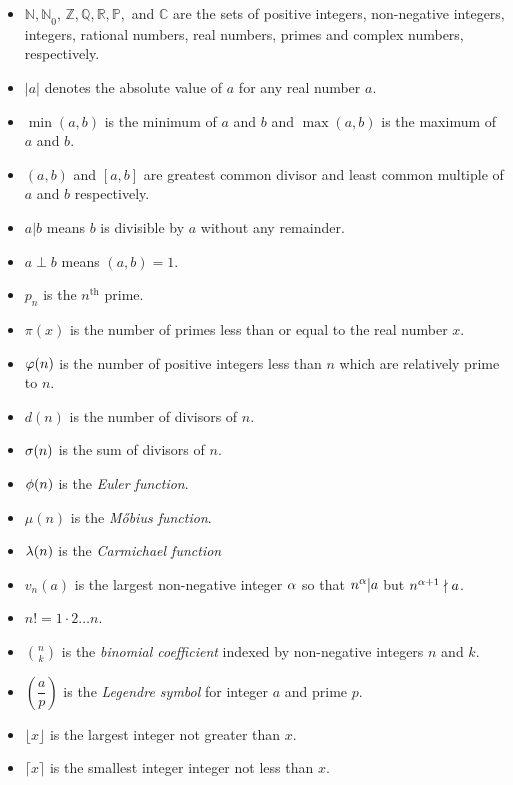 \documentclass{subfile}
\begin{document}
		\begin{itemize}
			\item $\mathbb{N,N}_0$, $\mathbb{Z, Q, R, P},$ and $\mathbb{C}$ are the sets of positive integers, non-negative integers, integers, rational numbers, real numbers, primes and complex numbers, respectively.
			\item $|a|$ denotes the absolute value of $a$ for any real number $a$.
			\item $\min(a,b)$ is the minimum of $a$ and $b$ and $\max(a,b)$ is the maximum of $a$ and $b$.
			\item $(a,b)$ and $[a,b]$ are greatest common divisor and least common multiple of $a$ and $b$ respectively.
			\item $a|b$ means $b$ is divisible by $a$ without any remainder.
			\item $a\perp b$ means $(a,b)=1$.
			\item $p_n$ is the $n^{\text{th}}$ prime.
			\item $\pi(x)$ is the number of primes less than or equal to the real number $x$.		
			\item $\varphi(n)$ is the number of positive integers less than $n$ which are relatively prime to $n$.
			\item $d(n)$ is the number of divisors of $n$.
			\item $\sigma(n)$ is the sum of divisors of $n$.
			\item $\phi(n)$ is the {\it Euler function}.
			\item $\mu(n)$ is the {\it M\H{o}bius function}.
			\item $\lambda(n)$ is the {\it Carmichael function}
			\item $v_n(a)$ is the largest non-negative integer $\alpha$ so that $n^\alpha|a$ but $n^{\alpha+1}\nmid a$.
			\item $n!=1\cdot2\dots n$.
			\item $\displaystyle \binom{n}{k}$ is the \textit{binomial coefficient} indexed by non-negative integers $n$ and $k$.
			\item $\left(\dfrac{a}{p}\right)$ is the \textit{Legendre symbol} for integer $a$ and prime $p$.
			\item $\lfloor x \rfloor$ is the  largest integer not greater than $x$.
			\item $\lceil x \rceil$ is the smallest integer integer not less than $x$.
		\end{itemize}
	
		\newpage
\end{document}
